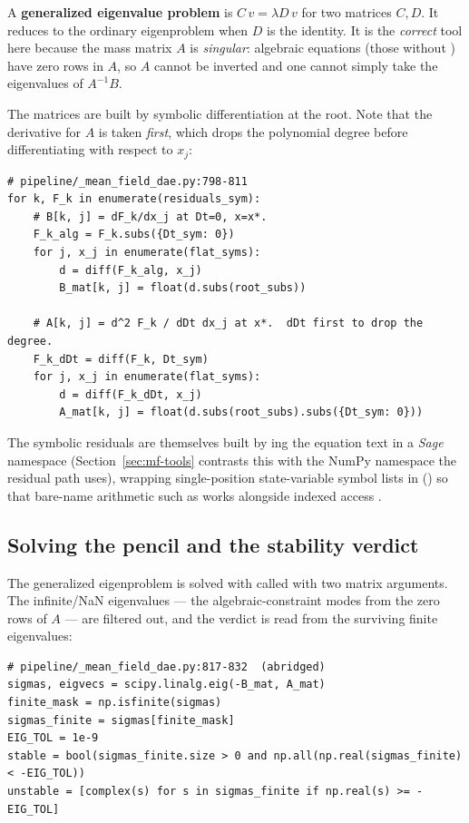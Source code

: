 \begin{defn}
A \textbf{generalized eigenvalue problem} is $C\,v = \lambda D\,v$ for two
matrices $C, D$. It reduces to the ordinary eigenproblem when $D$ is the identity.
It is the \emph{correct} tool here because the mass matrix $A$ is \emph{singular}:
algebraic equations (those without ) have zero rows in $A$, so $A$ cannot
be inverted and one cannot simply take the eigenvalues of $A^{-1}B$.
\end{defn}

The matrices are built by symbolic differentiation at the root. Note that the
 derivative for $A$ is taken \emph{first}, which drops the polynomial
degree before differentiating with respect to $x_j$:

\begin{lstlisting}
# pipeline/_mean_field_dae.py:798-811
for k, F_k in enumerate(residuals_sym):
    # B[k, j] = dF_k/dx_j at Dt=0, x=x*.
    F_k_alg = F_k.subs({Dt_sym: 0})
    for j, x_j in enumerate(flat_syms):
        d = diff(F_k_alg, x_j)
        B_mat[k, j] = float(d.subs(root_subs))

    # A[k, j] = d^2 F_k / dDt dx_j at x*.  dDt first to drop the degree.
    F_k_dDt = diff(F_k, Dt_sym)
    for j, x_j in enumerate(flat_syms):
        d = diff(F_k_dDt, x_j)
        A_mat[k, j] = float(d.subs(root_subs).subs({Dt_sym: 0}))
\end{lstlisting}

The symbolic residuals  are themselves built by ing
the equation text in a \emph{Sage} namespace (Section~\ref{sec:mf-tools} contrasts
this with the NumPy namespace the residual path uses), wrapping single-position
state-variable symbol lists in 
() so that bare-name arithmetic such as 
works alongside indexed access .

\subsection{Solving the pencil and the stability verdict}

The generalized eigenproblem is solved with  called with
two matrix arguments. The infinite/NaN eigenvalues --- the algebraic-constraint
modes from the zero rows of $A$ --- are filtered out, and the verdict is read from
the surviving finite eigenvalues:

\begin{lstlisting}
# pipeline/_mean_field_dae.py:817-832  (abridged)
sigmas, eigvecs = scipy.linalg.eig(-B_mat, A_mat)
finite_mask = np.isfinite(sigmas)
sigmas_finite = sigmas[finite_mask]
EIG_TOL = 1e-9
stable = bool(sigmas_finite.size > 0 and np.all(np.real(sigmas_finite) < -EIG_TOL))
unstable = [complex(s) for s in sigmas_finite if np.real(s) >= -EIG_TOL]
\end{lstlisting}

